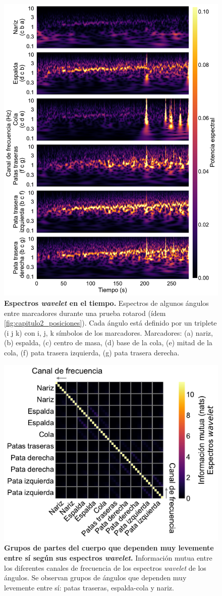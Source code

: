 \begin{appendix}
    \begin{figure}[htbp]
        \centering
        \includegraphics[width=0.7\linewidth]{figuras/capitulo2/espectros_wavelet.pdf}
        \caption{\textbf{Espectros \textit{wavelet} en el tiempo.}
            Espectros de algunos ángulos entre marcadores durante una prueba rotarod (ídem \autoref{fig:capitulo2_posiciones}).
            Cada ángulo está definido por un triplete (i j k) con i, j, k símbolos de los marcadores.
            Marcadores: (a) nariz, (b) espalda, (c) centro de masa, (d) base de la cola, (e) mitad de la cola, (f) pata trasera izquierda, (g) pata trasera derecha.}
        \label{fig:capitulo2_espectros_wavelet}
    \end{figure}

    \begin{figure}[htbp]
        \centering
        \includegraphics[width=0.7\linewidth]{figuras/capitulo4/mi_mean_wav.pdf}
        \caption{\textbf{Grupos de partes del cuerpo que dependen muy levemente entre sí según sus espectros \textit{wavelet}.}
            Información mutua entre los diferentes canales de frecuencia de los espectros \textit{wavelet} de los ángulos.
            Se observan grupos de ángulos que dependen muy levemente entre sí: patas traseras, espalda-cola y nariz.}
        \label{fig:capitulo2_mi_mean_wav}
    \end{figure}


\end{appendix}

